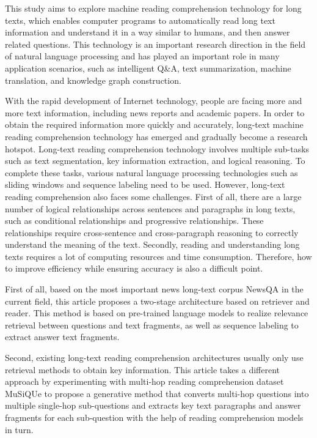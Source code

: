 
\begin{eabstract}

	This study aims to explore machine reading comprehension technology for long texts, which enables computer programs to automatically read long text information and understand it in a way similar to humans, and then answer related questions. This technology is an important research direction in the field of natural language processing and has played an important role in many application scenarios, such as intelligent Q\&A, text summarization, machine translation, and knowledge graph construction.
	
	With the rapid development of Internet technology, people are facing more and more text information, including news reports and academic papers. In order to obtain the required information more quickly and accurately, long-text machine reading comprehension technology has emerged and gradually become a research hotspot. Long-text reading comprehension technology involves multiple sub-tasks such as text segmentation, key information extraction, and logical reasoning. To complete these tasks, various natural language processing technologies such as sliding windows and sequence labeling need to be used. However, long-text reading comprehension also faces some challenges. First of all, there are a large number of logical relationships across sentences and paragraphs in long texts, such as conditional relationships and progressive relationships. These relationships require cross-sentence and cross-paragraph reasoning to correctly understand the meaning of the text. Secondly, reading and understanding long texts requires a lot of computing resources and time consumption. Therefore, how to improve efficiency while ensuring accuracy is also a difficult point.
	
	First of all, based on the most important news long-text corpus NewsQA in the current field, this article proposes a two-stage architecture based on retriever and reader. This method is based on pre-trained language models to realize relevance retrieval between questions and text fragments, as well as sequence labeling to extract answer text fragments.
	
	Second, existing long-text reading comprehension architectures usually only use retrieval methods to obtain key information. This article takes a different approach by experimenting with multi-hop reading comprehension dataset MuSiQUe to propose a generative method that converts multi-hop questions into multiple single-hop sub-questions and extracts key text paragraphs and answer fragments for each sub-question with the help of reading comprehension models in turn.
	

\end{eabstract}
